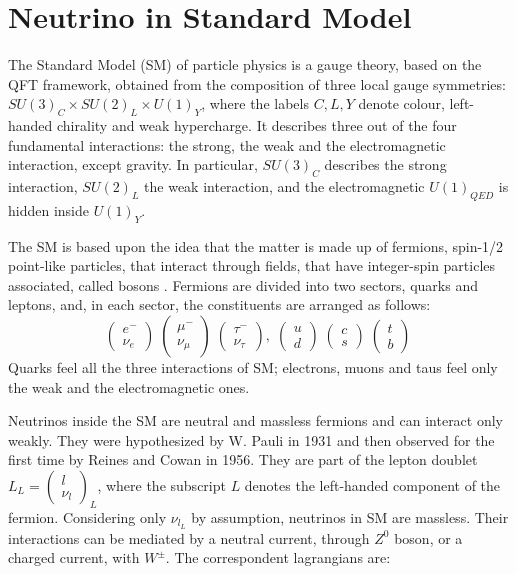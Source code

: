 \section{Neutrino in Standard Model}
\label{sm_neutrinos}
The Standard Model (SM) of particle physics is a gauge theory, based on the QFT framework, obtained from the composition of three local gauge symmetries: $SU(3)_{C} \times SU(2)_{L} \times U(1)_{Y}$, where the labels $C,L,Y$ denote colour, left-handed chirality and weak hypercharge. It describes three out of the four fundamental interactions: the strong, the weak and the electromagnetic interaction, except gravity. In particular, $SU(3)_{C}$ describes the strong interaction, $SU(2)_{L}$ the weak interaction, and the electromagnetic $U(1)_{QED}$ is hidden inside $U(1)_{Y}$.

The SM is based upon the idea that the matter is made up of fermions, spin-1/2 point-like particles, that interact through fields, that have integer-spin particles associated, called bosons \cite{cottingham_greenwood_2007}.
Fermions are divided into two sectors, quarks and leptons, and, in each sector, the constituents are arranged as follows: 
\[
\begin{pmatrix} e^{-} \\ \nu_e \end{pmatrix} \;
\begin{pmatrix} \mu^{-} \\ \nu_{\mu} \end{pmatrix} \;
\begin{pmatrix} \tau^{-} \\ \nu_{\tau} \end{pmatrix}, \;
\begin{pmatrix} u \\ d \end{pmatrix} \;
\begin{pmatrix} c \\ s \end{pmatrix} \;
\begin{pmatrix} t \\ b \end{pmatrix} \;\]
Quarks feel all the three interactions of SM; electrons, muons and taus feel only the weak and the electromagnetic ones.

Neutrinos inside the SM are neutral and massless fermions and can interact only weakly. They were hypothesized by W. Pauli in 1931 and then observed for the first time by Reines and Cowan in 1956. They are part of the lepton doublet $L_L = \begin{pmatrix} l \\ \nu_l \end{pmatrix}_L$, where the subscript $L$ denotes the left-handed component of the fermion. Considering only $\nu_{l_L}$ by assumption, neutrinos in SM are massless.
Their interactions can be mediated by a neutral current, through $Z^0$ boson, or a charged current, with $W^\pm$. The correspondent lagrangians are:

